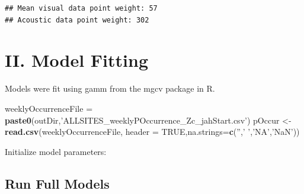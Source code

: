 \documentclass[11pt,]{article}
\newenvironment{Shaded}{\begin{snugshade}}{\end{snugshade}}
\newcommand{\KeywordTok}[1]{\textcolor[rgb]{0.13,0.29,0.53}{\textbf{{#1}}}}
\newcommand{\DataTypeTok}[1]{\textcolor[rgb]{0.13,0.29,0.53}{{#1}}}
\newcommand{\DecValTok}[1]{\textcolor[rgb]{0.00,0.00,0.81}{{#1}}}
\newcommand{\StringTok}[1]{\textcolor[rgb]{0.31,0.60,0.02}{{#1}}}
\newcommand{\CommentTok}[1]{\textcolor[rgb]{0.56,0.35,0.01}{\textit{{#1}}}}
\newcommand{\OtherTok}[1]{\textcolor[rgb]{0.56,0.35,0.01}{{#1}}}
\newcommand{\NormalTok}[1]{{#1}}
\begin{document}
\begin{verbatim}
## Mean visual data point weight: 57
## Acoustic data point weight: 302
\end{verbatim}

\section{II. Model Fitting}\label{ii.-model-fitting}

Models were fit using gamm from the mgcv package in R.

\begin{Shaded}
\begin{Highlighting}[]
\NormalTok{weeklyOccurrenceFile =}\StringTok{ }\KeywordTok{paste0}\NormalTok{(outDir,}\StringTok{'ALLSITES_weeklyPOccurrence_Zc_jahStart.csv'}\NormalTok{)}
\NormalTok{pOccur <-}\StringTok{ }\KeywordTok{read.csv}\NormalTok{(weeklyOccurrenceFile, }\DataTypeTok{header =} \OtherTok{TRUE}\NormalTok{,}\DataTypeTok{na.strings=}\KeywordTok{c}\NormalTok{(}\StringTok{''}\NormalTok{,}\StringTok{' '}\NormalTok{,}\StringTok{'NA'}\NormalTok{,}\StringTok{'NaN'}\NormalTok{))}
\end{Highlighting}
\end{Shaded}

Initialize model parameters:

\begin{Shaded}
\end{Shaded}

\subsection{Run Full Models}\label{run-full-models}
\end{document}
